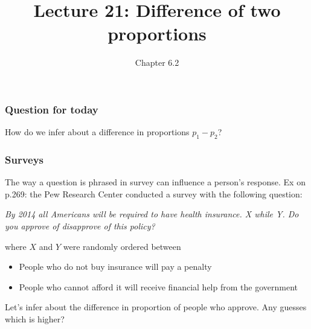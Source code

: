 \documentclass[handout]{beamer}
\title{Lecture 21: Difference of two proportions}
\author{Chapter 6.2}
\date{}
\newcommand{\blue}[1]{\textcolor{blue2}{#1}}
\begin{document}
\begin{frame}
\titlepage
\end{frame}


\begin{frame}[fragile]
\frametitle{Question for today}

How do we infer about a difference in proportions $p_1-p_2$?

\end{frame}


\begin{frame}[fragile]
\frametitle{Surveys}

The way a question is phrased in survey can influence a person's response.  Ex on p.269: the Pew Research Center conducted a survey with the following question:

\pause\vspace{0.5cm}

\textit{By 2014 all Americans will be required to have health insurance.  \blue{X while Y}.  Do you approve of disapprove of this policy?}

\pause\vspace{0.5cm}

where $X$ and $Y$ were randomly ordered between
\begin{itemize}
\item People who do not buy insurance will pay a penalty
\item People who cannot afford it will receive financial help from the government
\end{itemize}

\vspace{0.5cm}

\pause Let's infer about the difference in proportion of people who \blue{approve}.  Any guesses which is higher?

\end{frame}
\end{document}
